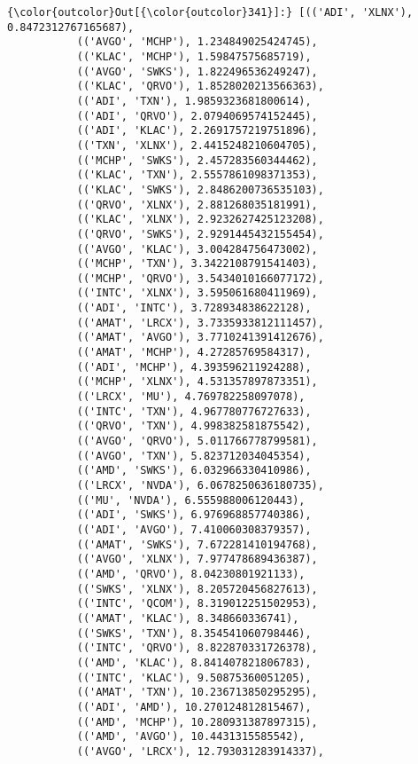 \documentclass[11pt]{article}
\begin{document}
\begin{Verbatim}[commandchars=\\\{\}]
{\color{outcolor}Out[{\color{outcolor}341}]:} [(('ADI', 'XLNX'), 0.8472312767165687),
           (('AVGO', 'MCHP'), 1.234849025424745),
           (('KLAC', 'MCHP'), 1.59847575685719),
           (('AVGO', 'SWKS'), 1.822496536249247),
           (('KLAC', 'QRVO'), 1.8528020213566363),
           (('ADI', 'TXN'), 1.9859323681800614),
           (('ADI', 'QRVO'), 2.0794069574152445),
           (('ADI', 'KLAC'), 2.2691757219751896),
           (('TXN', 'XLNX'), 2.4415248210604705),
           (('MCHP', 'SWKS'), 2.457283560344462),
           (('KLAC', 'TXN'), 2.5557861098371353),
           (('KLAC', 'SWKS'), 2.8486200736535103),
           (('QRVO', 'XLNX'), 2.881268035181991),
           (('KLAC', 'XLNX'), 2.9232627425123208),
           (('QRVO', 'SWKS'), 2.9291445432155454),
           (('AVGO', 'KLAC'), 3.004284756473002),
           (('MCHP', 'TXN'), 3.3422108791541403),
           (('MCHP', 'QRVO'), 3.5434010166077172),
           (('INTC', 'XLNX'), 3.595061680411969),
           (('ADI', 'INTC'), 3.728934838622128),
           (('AMAT', 'LRCX'), 3.7335933812111457),
           (('AMAT', 'AVGO'), 3.7710241391412676),
           (('AMAT', 'MCHP'), 4.27285769584317),
           (('ADI', 'MCHP'), 4.393596211924288),
           (('MCHP', 'XLNX'), 4.531357897873351),
           (('LRCX', 'MU'), 4.769782258097078),
           (('INTC', 'TXN'), 4.967780776727633),
           (('QRVO', 'TXN'), 4.998382581875542),
           (('AVGO', 'QRVO'), 5.011766778799581),
           (('AVGO', 'TXN'), 5.823712034045354),
           (('AMD', 'SWKS'), 6.032966330410986),
           (('LRCX', 'NVDA'), 6.0678250636180735),
           (('MU', 'NVDA'), 6.555988006120443),
           (('ADI', 'SWKS'), 6.976968857740386),
           (('ADI', 'AVGO'), 7.410060308379357),
           (('AMAT', 'SWKS'), 7.672281410194768),
           (('AVGO', 'XLNX'), 7.977478689436387),
           (('AMD', 'QRVO'), 8.04230801921133),
           (('SWKS', 'XLNX'), 8.205720456827613),
           (('INTC', 'QCOM'), 8.319012251502953),
           (('AMAT', 'KLAC'), 8.348660336741),
           (('SWKS', 'TXN'), 8.354541060798446),
           (('INTC', 'QRVO'), 8.822870331726378),
           (('AMD', 'KLAC'), 8.841407821806783),
           (('INTC', 'KLAC'), 9.50875360051205),
           (('AMAT', 'TXN'), 10.236713850295295),
           (('ADI', 'AMD'), 10.270124812815467),
           (('AMD', 'MCHP'), 10.280931387897315),
           (('AMD', 'AVGO'), 10.4431315585542),
           (('AVGO', 'LRCX'), 12.793031283914337),

\end{Verbatim}
\end{document}
